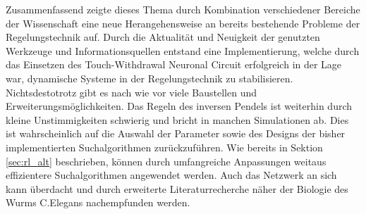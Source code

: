	Zusammenfassend zeigte dieses Thema durch Kombination verschiedener Bereiche der Wissenschaft eine neue Herangehensweise an bereits bestehende Probleme der Regelungstechnik auf. Durch die Aktualität und Neuigkeit der genutzten Werkzeuge und Informationsquellen entstand eine Implementierung, welche durch das Einsetzen des Touch-Withdrawal Neuronal Circuit \cite{WormLevelRL} erfolgreich in der Lage war, dynamische Systeme in der Regelungstechnik zu stabilisieren.\\
	Nichtsdestotrotz gibt es nach wie vor viele Baustellen und Erweiterungsmöglichkeiten. Das Regeln des inversen Pendels ist weiterhin durch kleine Unstimmigkeiten schwierig und bricht in manchen Simulationen ab. Dies ist wahrscheinlich auf die Auswahl der Parameter sowie des Designs der bisher implementierten Suchalgorithmen zurückzuführen. Wie bereits in Sektion \ref{sec:rl_alt} beschrieben, können durch umfangreiche Anpassungen weitaus effizientere Suchalgorithmen angewendet werden. Auch das Netzwerk an sich kann überdacht und durch erweiterte Literaturrecherche näher der Biologie des Wurms C.Elegans nachempfunden werden.

